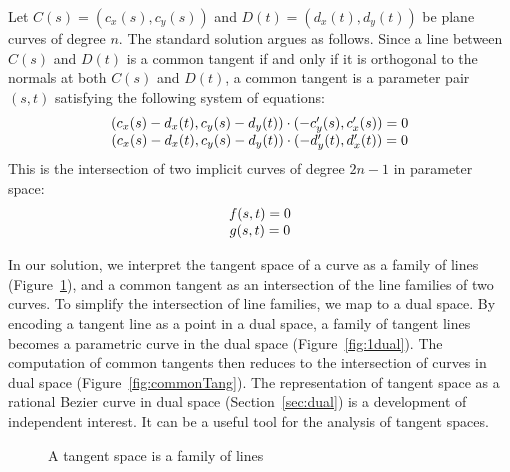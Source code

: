 \documentclass[10pt,twocolumn]{article}
\begin{document}
Let $C(s) = (c_x(s),c_y(s))$ and $D(t) = (d_x(t),d_y(t))$ be 
plane curves of degree $n$.
The standard solution \cite{bajajkim87,parida95} argues as follows.
Since a line between $C(s)$ and $D(t)$ is a common tangent if and only if 
it is orthogonal to the normals at both $C(s)$ and $D(t)$,
a common tangent is a parameter pair $(s,t)$ satisfying the following
system of equations:
%
\[
\begin{tabular}{c}
$(c_x(s) - d_x(t), c_y(s) - d_y(t)) \cdot (-c_y'(s), c_x'(s)) = 0$\\
$(c_x(s) - d_x(t), c_y(s) - d_y(t)) \cdot (-d_y'(t), d_x'(t)) = 0$
\end{tabular}
\]
%
This is the intersection of two implicit curves of degree $2n-1$
in parameter space:
\[
\begin{tabular}{c}
$f(s,t)=0$\\
$g(s,t)=0$
\end{tabular}
\]


In our solution, we interpret the tangent space of a curve as a family of lines
(Figure~\ref{fig:linefamily}),
and a common tangent as an intersection of the line families of two curves.
To simplify the intersection of line families,
we map to a dual space. %
By encoding a tangent line as a point in a dual space,
a family of tangent lines becomes a parametric curve in the dual space
(Figure~\ref{fig:1dual}).
The computation of common tangents then reduces to the intersection of 
curves in dual space (Figure~\ref{fig:commonTang}).
The representation of tangent space as a rational Bezier curve in dual space
(Section~\ref{sec:dual}) is a development of independent interest.
It can be a useful tool for the analysis of tangent spaces.



\begin{figure}
\hspace{.5in} \setjjdufam
\caption{A tangent space is a family of lines}
\label{fig:linefamily}
\end{figure}
\end{document}
